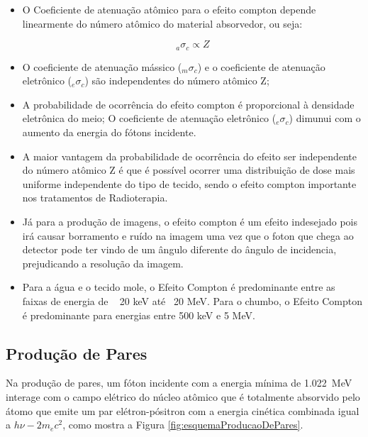 \documentclass[11pt,a4paper]{article}
\begin{document}
                    \begin{itemize}
                        \item O Coeficiente de atenuação atômico para o efeito compton depende linearmente do número atômico do material absorvedor, ou seja:
                        
                            $${}_a\sigma_c \propto Z $$

                        \item O coeficiente de atenuação mássico (${}_m\sigma_c$) e o coeficiente de atenuação eletrônico (${}_e\sigma_c$) são independentes do número atômico Z;
                        
                        \item A probabilidade de ocorrência do efeito compton é proporcional à densidade eletrônica do meio; O coeficiente de atenuação eletrônico (${}_e\sigma_c$) dimunui com o aumento da energia do fótons incidente.
                        
                        \item A maior vantagem da probabilidade de ocorrência do efeito ser independente do número atômico Z é que é possível ocorrer uma distribuição de dose mais uniforme independente do tipo de tecido, sendo o efeito compton importante nos tratamentos de Radioterapia.
                        
                        \item Já para a produção de imagens, o efeito compton é um efeito indesejado pois irá causar borramento e ruído na imagem uma vez que o foton que chega ao detector pode ter vindo de um ângulo diferente do ângulo de incidencia, prejudicando a resolução da imagem.
                        
                        \item Para a água e o tecido mole, o Efeito Compton é predominante entre as faixas de energia de ~ 20 keV até ~20 MeV. Para o chumbo, o Efeito Compton é predominante para energias entre 500 keV e 5 MeV.
                    \end{itemize}
            
        \subsection{Produção de Pares}

                Na produção de pares, um fóton incidente com a energia mínima de \qty{1.022}{MeV} interage com o campo elétrico do núcleo atômico que é totalmente absorvido pelo átomo que emite um par elétron-pósitron com a energia cinética combinada igual a $h\nu - 2 m_ec^2$, como mostra a Figura \ref{fig:esquemaProducaoDePares}.
\end{document}
